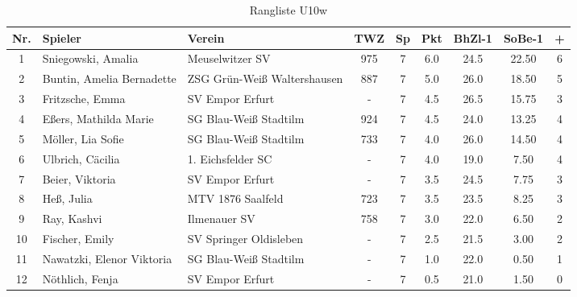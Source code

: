 \begin{table}[H]
\centering
\begin{tabular}{|c|l|l|c|c|c|c|c|c|}
\hline
Nr. & Spieler & Verein & TWZ & Sp & Pkt & BhZl-1 & SoBe-1 & + \\ \hline
1 & Sniegowski, Amalia & Meuselwitzer SV & 975 & 7 & 6.0 & 24.5 & 22.50 & 6 \\
2 & Buntin, Amelia Bernadette & ZSG Grün-Weiß Waltershausen & 887 & 7 & 5.0 & 26.0 & 18.50 & 5 \\
3 & Fritzsche, Emma & SV Empor Erfurt & - & 7 & 4.5 & 26.5 & 15.75 & 3 \\
4 & Eßers, Mathilda Marie & SG Blau-Weiß Stadtilm & 924 & 7 & 4.5 & 24.0 & 13.25 & 4 \\
5 & Möller, Lia Sofie & SG Blau-Weiß Stadtilm & 733 & 7 & 4.0 & 26.0 & 14.50 & 4 \\
6 & Ulbrich, Cäcilia & 1. Eichsfelder SC & - & 7 & 4.0 & 19.0 & 7.50 & 4 \\
7 & Beier, Viktoria & SV Empor Erfurt & - & 7 & 3.5 & 24.5 & 7.75 & 3 \\
8 & Heß, Julia & MTV 1876 Saalfeld & 723 & 7 & 3.5 & 23.5 & 8.25 & 3 \\
9 & Ray, Kashvi & Ilmenauer SV & 758 & 7 & 3.0 & 22.0 & 6.50 & 2 \\
10 & Fischer, Emily & SV Springer Oldisleben & - & 7 & 2.5 & 21.5 & 3.00 & 2 \\
11 & Nawatzki, Elenor Viktoria & SG Blau-Weiß Stadtilm & - & 7 & 1.0 & 22.0 & 0.50 & 1 \\
12 & Nöthlich, Fenja & SV Empor Erfurt & - & 7 & 0.5 & 21.0 & 1.50 & 0 \\ \hline
\end{tabular}
\caption{Rangliste U10w}
\label{tab:Rangliste_U10w}
\end{table}